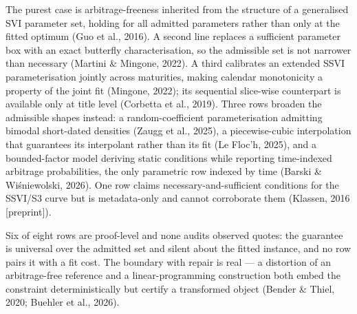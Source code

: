 \documentclass[11pt]{article}
\begin{document}
The purest case is arbitrage-freeness inherited from the structure of a generalised SVI parameter set, holding for all admitted parameters rather than only at the fitted optimum (Guo et al., 2016). A second line replaces a sufficient parameter box with an exact butterfly characterisation, so the admissible set is not narrower than necessary (Martini \& Mingone, 2022). A third calibrates an extended SSVI parameterisation jointly across maturities, making calendar monotonicity a property of the joint fit (Mingone, 2022); its sequential slice-wise counterpart is available only at title level (Corbetta et al., 2019). Three rows broaden the admissible shapes instead: a random-coefficient parameterisation admitting bimodal short-dated densities (Zaugg et al., 2025), a piecewise-cubic interpolation that guarantees its interpolant rather than its fit (Le Floc’h, 2025), and a bounded-factor model deriving static conditions while reporting time-indexed arbitrage probabilities, the only parametric row indexed by time (Barski \& Wiśniewolski, 2026). One row claims necessary-and-sufficient conditions for the SSVI/S3 curve but is metadata-only and cannot corroborate them (Klassen, 2016 [preprint]).

Six of eight rows are proof-level and none audits observed quotes: the guarantee is universal over the admitted set and silent about the fitted instance, and no row pairs it with a fit cost. The boundary with repair is real — a distortion of an arbitrage-free reference and a linear-programming construction both embed the constraint deterministically but certify a transformed object (Bender \& Thiel, 2020; Buehler et al., 2026).
\end{document}
